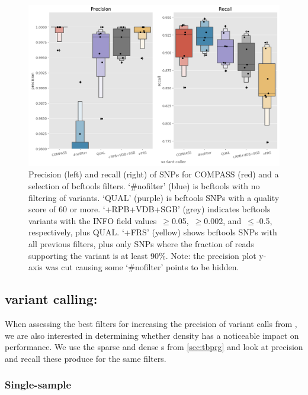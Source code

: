 \begin{figure}
\begin{center}
\includegraphics[width=0.90\columnwidth]{Chapter2/Figs/bcftools-precision-recall-filters.png}
\caption{{Precision (left) and recall (right) of SNPs for COMPASS (red) and a
selection of bcftools filters. `\#nofilter' (blue) is bcftools with no
filtering of variants. `QUAL' (purple) is bcftools SNPs with a quality score of
60 or more. `+RPB+VDB+SGB' (grey) indicates bcftools variants with the INFO
field values~\(\ge\)0.05,~\(\ge\)0.002,
and~\(\le\)-0.5, respectively, plus QUAL. `+FRS' (yellow) shows
bcftools SNPs with all previous filters, plus only SNPs where the
fraction of reads supporting the variant is at least 90\%. Note: the
precision plot y-axis was cut causing some `\#nofilter' points to be
hidden.
{\label{fig:bcftools-filters}}%
}}
\end{center}
\end{figure}


\subsection{\ont{} variant calling: \pandora{}}
\label{sec:pandora-filters}

When assessing the best filters for increasing the precision of variant calls from \pandora{}, we are also interested in determining whether \prg{} density has a noticeable impact on performance. We use the sparse and dense \prg{}s from \autoref{sec:tbprg} and look at precision and recall these produce for the same filters.

\subsubsection{Single-sample}
\label{sec:map-var-calls}

